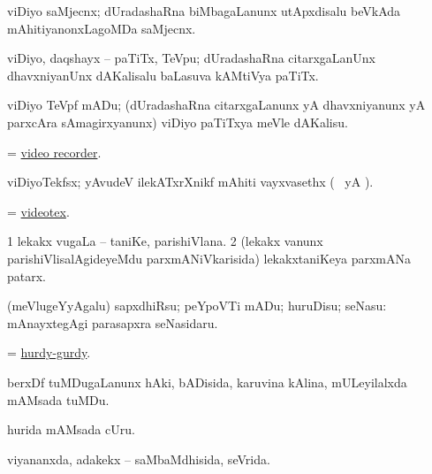 \bentry
{} 
\gl{\nA}
\expl{}
\bmng
 viDiyo saMjecnx; dUradashaRna biMbagaLanunx utApxdisalu beVkAda mAhitiyanonxLagoMDa saMjecnx. 
\emng
\eentry

\bentry
{} 
\gl{\nA}
\expl{}
\bmng
 viDiyo, daqshayx -- paTiTx, TeVpu; dUradashaRna citarxgaLanUnx dhavxniyanUnx dAKalisalu baLasuva kAMtiVya paTiTx. 
\emng
\eentry

\bentry 
{} 
\gl{\sakirx}
\expl{}
\bmng
 viDiyo TeVpf mADu; (dUradashaRna citarxgaLanunx yA dhavxniyanunx yA parxcAra sAmagirxyanunx) viDiyo paTiTxya meVle dAKalisu. 
\emng
\eentry

\bentry
{}
\gl{\nA}
\expl{}
\bmng
 = \hyperlink{video recorder}{video recorder}. 
\emng
\eentry

\bentry
{} 
\gl{\nA}
\expl{}
\bmng
 viDiyoTekfsx; yAvudeV ilekATxrXnikf mAhiti vayxvasethx (\kanmu\  yA ). 
\emng
\eentry

\bentry
{} 
\gl{\nA}
\expl{}
\bmng
 = \hyperlink{videotex}{videotex}. 
\emng
\eentry

\bentry
{} 
\gl{\nA}
\expl{}
\bmng
\bnum
\num{1} lekakx \mo vugaLa -- taniKe, parishiVlana. 
\num{2} (lekakx \mo vanunx parishiVlisalAgideyeMdu parxmANiVkarisida) lekakxtaniKeya parxmANa patarx. 
\enum
\emng
\eentry

\bentry
{} 
\gl{\akirx}
\bmng
 (meVlugeYyAgalu) sapxdhiRsu; peYpoVTi mADu; huruDisu; seNasu:  mAnayxtegAgi parasapxra seNasidaru. 
\emng
\eentry

\bentry
{} 
\gl{\nA}
\expl{}
\bmng
 = \hyperref{kandict_h.pdf}{H}{hurdy-gurdy}{hurdy-gurdy}. 
\emng
\eentry

\bentry
{} 
\gl{\nA}
\expl{}
\bmng
 berxDf tuMDugaLanunx hAki, bADisida, karuvina kAlina, mULeyilalxda mAMsada tuMDu. 
\emng
\eentry

\bentry
{}
\gl{\nA}
\expl{}
\bmng
 hurida mAMsada cUru. 
\emng
\eentry

\bentry
{} 
\gl{\gu}
\expl{}
\bmng
 viyananxda, adakekx -- saMbaMdhisida, seVrida. 
\emng
\eentry

